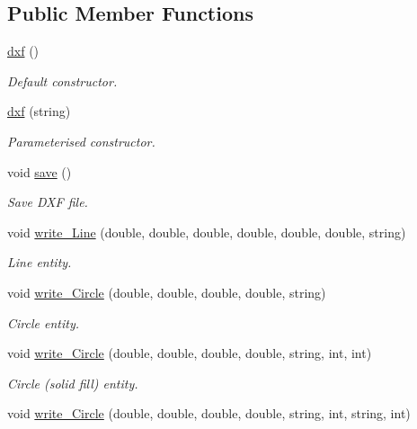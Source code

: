 \subsection*{Public Member Functions}
\begin{DoxyCompactItemize}
\item 
\hypertarget{classdxf_ac4deaef37b2db70a0361104c66e0b481}{\hyperlink{classdxf_ac4deaef37b2db70a0361104c66e0b481}{dxf} ()}\label{classdxf_ac4deaef37b2db70a0361104c66e0b481}

\begin{DoxyCompactList}\small\item\em Default constructor. \end{DoxyCompactList}\item 
\hyperlink{classdxf_abae446dc642503b58fd45bcd22e08d78}{dxf} (string)
\begin{DoxyCompactList}\small\item\em Parameterised constructor. \end{DoxyCompactList}\item 
void \hyperlink{classdxf_a4daa6ebaa33481a5893d31095753fb09}{save} ()
\begin{DoxyCompactList}\small\item\em Save D\-X\-F file. \end{DoxyCompactList}\item 
void \hyperlink{classdxf_aa79b15af723a7df01acf575957e2104d}{write\-\_\-\-Line} (double, double, double, double, double, double, string)
\begin{DoxyCompactList}\small\item\em Line entity. \end{DoxyCompactList}\item 
void \hyperlink{classdxf_a45735534e1e6417003633a8a33ccebde}{write\-\_\-\-Circle} (double, double, double, double, string)
\begin{DoxyCompactList}\small\item\em Circle entity. \end{DoxyCompactList}\item 
void \hyperlink{classdxf_a62a9d48800f66a6811822264426a8ee0}{write\-\_\-\-Circle} (double, double, double, double, string, int, int)
\begin{DoxyCompactList}\small\item\em Circle (solid fill) entity. \end{DoxyCompactList}\item 
void \hyperlink{classdxf_a793fdaf19224abd12a239bcad0eda01b}{write\-\_\-\-Circle} (double, double, double, double, string, int, string, int)

\end{DoxyCompactItemize}
